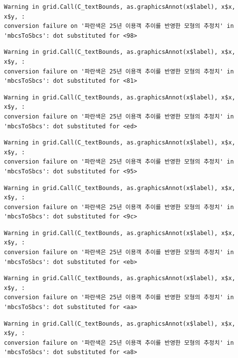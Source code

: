 \documentclass[
  letterpaper,
  DIV=11,
  numbers=noendperiod]{scrreprt}
\begin{document}
\begin{verbatim}
Warning in grid.Call(C_textBounds, as.graphicsAnnot(x$label), x$x, x$y, :
conversion failure on '파란색은 25년 이용객 추이를 반영한 모형의 추정치' in
'mbcsToSbcs': dot substituted for <98>
\end{verbatim}

\begin{verbatim}
Warning in grid.Call(C_textBounds, as.graphicsAnnot(x$label), x$x, x$y, :
conversion failure on '파란색은 25년 이용객 추이를 반영한 모형의 추정치' in
'mbcsToSbcs': dot substituted for <81>
\end{verbatim}

\begin{verbatim}
Warning in grid.Call(C_textBounds, as.graphicsAnnot(x$label), x$x, x$y, :
conversion failure on '파란색은 25년 이용객 추이를 반영한 모형의 추정치' in
'mbcsToSbcs': dot substituted for <ed>
\end{verbatim}

\begin{verbatim}
Warning in grid.Call(C_textBounds, as.graphicsAnnot(x$label), x$x, x$y, :
conversion failure on '파란색은 25년 이용객 추이를 반영한 모형의 추정치' in
'mbcsToSbcs': dot substituted for <95>
\end{verbatim}

\begin{verbatim}
Warning in grid.Call(C_textBounds, as.graphicsAnnot(x$label), x$x, x$y, :
conversion failure on '파란색은 25년 이용객 추이를 반영한 모형의 추정치' in
'mbcsToSbcs': dot substituted for <9c>
\end{verbatim}

\begin{verbatim}
Warning in grid.Call(C_textBounds, as.graphicsAnnot(x$label), x$x, x$y, :
conversion failure on '파란색은 25년 이용객 추이를 반영한 모형의 추정치' in
'mbcsToSbcs': dot substituted for <eb>
\end{verbatim}

\begin{verbatim}
Warning in grid.Call(C_textBounds, as.graphicsAnnot(x$label), x$x, x$y, :
conversion failure on '파란색은 25년 이용객 추이를 반영한 모형의 추정치' in
'mbcsToSbcs': dot substituted for <aa>
\end{verbatim}

\begin{verbatim}
Warning in grid.Call(C_textBounds, as.graphicsAnnot(x$label), x$x, x$y, :
conversion failure on '파란색은 25년 이용객 추이를 반영한 모형의 추정치' in
'mbcsToSbcs': dot substituted for <a8>
\end{verbatim}
\end{document}
